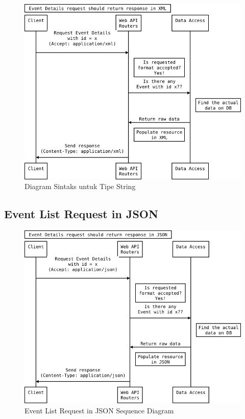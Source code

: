 \documentclass[a4paper, 12pt, oneside]{report}
\begin{document}
\begin{figure}[htp]
\centering
\includegraphics[scale=0.60]{images/event-details-request-seq-diagram-xml.png}
\caption{Diagram Sintaks untuk Tipe String}
\label{event-details-requset-seq-diagram-xml}
\end{figure}

\newpage

\subsection{Event List Request in JSON}

\begin{figure}[htp]
\centering
\includegraphics[scale=0.60]{images/event-details-request-seq-diagram-json.png}
\caption{Event List Request in JSON Sequence Diagram}
\label{event-list-request-seq-diagram-json}
\end{figure}
\end{document}
